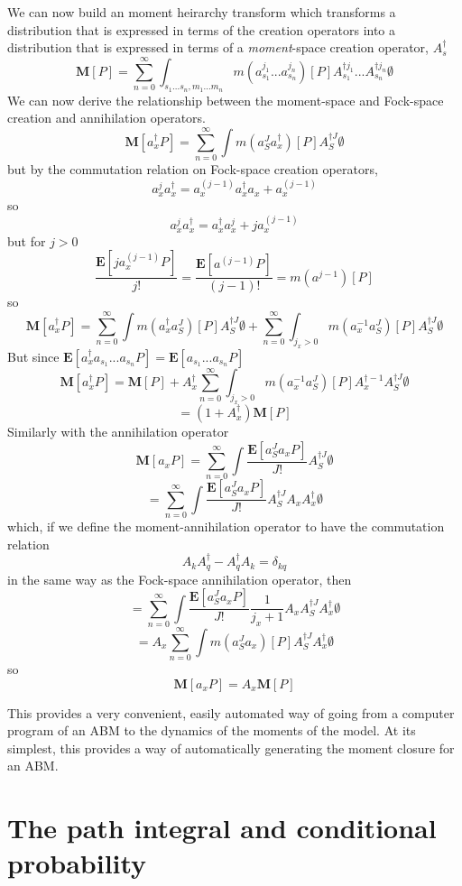 \documentclass[letterpaper,twocolumn,10pt]{article}
\begin{document}
We can now build an moment heirarchy transform which transforms a distribution that is expressed in terms of the creation operators into a distribution that is expressed in terms of a \textit{moment}-space creation operator, $A_s^\dag$ 
\[
\mathbf{M}[P] = \sum_{n=0}^\infty \int_{s_1...s_n,m_1...m_n} m(a_{s_1}^{j_1}...a_{s_n}^{j_n})[P] A_{s_1}^{\dag j_1}...A_{s_n}^{\dag j_n}\emptyset 
\]
We can now derive the relationship between the moment-space and Fock-space creation and annihilation operators.
\[
\mathbf{M}[a_x^\dag P] = \sum_{n=0}^\infty \int m(a_S^J a_x^\dag)[P] A_S^{\dag J}\emptyset 
\]
but by the commutation relation on Fock-space creation operators,
\[
a_x^j a_x^\dag = a_x^{(j-1)}a_x^\dag a_x + a_x^{(j-1)}
\]
so
\[
a_x^j a_x^\dag = a_x^\dag a_x^j + j a_x^{(j-1)}
\]
but for $j>0$
\[
\frac{\mathbf{E}[j a_x^{(j-1)}P]}{j!} = \frac{\mathbf{E}[a^{(j-1)}P]}{(j-1)!} = m(a^{j-1})[P]
\]
so
\[
\mathbf{M}[a_x^\dag P] = \sum_{n=0}^\infty \int m(a_x^\dag a_S^J )[P] A_S^{\dag J}\emptyset  + \sum_{n=0}^\infty \int_{j_x > 0} m(a_x^{-1}a_S^J)[P] A_S^{\dag J}\emptyset 
\]
But since $\mathbf{E}[a_x^\dag  a_{s_1}...a_{s_n}P] = \mathbf{E}[a_{s_1}...a_{s_n}P]$
\[
\mathbf{M}[a_x^\dag P] = \mathbf{M}[P] + A_x^\dag \sum_{n=0}^\infty \int_{j_x>0} m(a_x^{-1}a_S^J)[P] A_x^{\dag -1}A_S^{\dag J}\emptyset 
\]
\[
= (1+A_x^\dag)\mathbf{M}[P]
\]
Similarly with the annihilation operator
\[
\mathbf{M}[a_x P] = \sum_{n=0}^\infty \int \frac{\mathbf{E}[a_S^J a_x P]}{J!} A_{S}^{\dag J}\emptyset 
\]
\[
= \sum_{n=0}^\infty \int \frac{\mathbf{E}[a_S^J a_x P]}{J!} A_{S}^{\dag J} A_x A_x^\dag \emptyset 
\]
which, if we define the moment-annihilation operator to have the commutation relation
\[
A_kA_q^\dag - A_q^\dag A_k = \delta_{kq}
\]
in the same way as the Fock-space annihilation operator, then
\[
= \sum_{n=0}^\infty \int \frac{\mathbf{E}[a_S^J a_x P]}{J!}  \frac{1}{j_x+1}A_x A_{S}^{\dag J} A_x^\dag \emptyset 
\]
\[
= A_x \sum_{n=0}^\infty \int m(a_S^J a_x) [P]  A_{S}^{\dag J} A_x^\dag \emptyset 
\]
so
\[
\mathbf{M}[a_x P] = A_x\mathbf{M}[P]
\]

This provides a very convenient, easily automated way of going from a computer program of an ABM to the dynamics of the moments of the model. At its simplest, this provides a way of automatically generating the moment closure for an ABM.

\section{The path integral and conditional probability}
\end{document}
